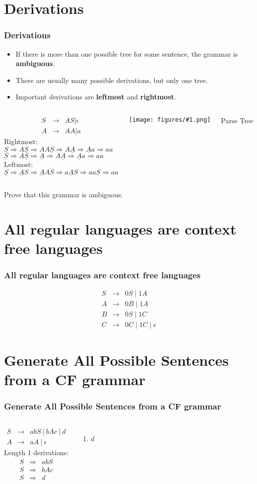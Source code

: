 \documentclass{beamer}
\newcommand{\myfig}[1]{\centerline{\texttt{[image: figures/\#1.png]}}}
\newcommand{\arr}{&\rightarrow&}
\newcommand{\darr}{&\Rightarrow&}
\newcommand{\dar}{\Rightarrow}
\newcommand{\bee}{\begin{eqnarray*}}
\newcommand{\eee}{\end{eqnarray*}}
\newcommand{\emptystring}{\ensuremath{\epsilon}}
\newcommand{\bi}{\begin{itemize}}
\newcommand{\li}{\item}
\newcommand{\ei}{\end{itemize}}
\newcommand{\sect}[1]{
\section{#1}
\begin{frame}[fragile]\frametitle{#1}
}
\begin{document}
\newcommand{\ul}[1]{\underline{#1}}
\sect{Derivations}
\bi
\li If there is more than one possible tree for some sentence, 
the grammar is {\bf ambiguous}.
\li There are usually many possible derivations, but only one tree.
\li Important derivations are {\bf leftmost} and {\bf rightmost}.
\ei
\begin{columns}
\bee
S \arr AS | \emptystring \\
A \arr AA | a
\eee
Rightmost:\\
\(
\ul{S} \dar A\ul{S} \dar AA\ul{S} \dar A\ul{A} \dar \ul{A}a \dar aa
\)\\
\(
\ul{S} \dar A\ul{S} \dar \ul{A} \dar A\ul{A} \dar \ul{A}a \dar aa
\)\\
Leftmost:\\
\(
\ul{S} \dar \ul{A}S \dar \ul{A}AS \dar a\ul{A}S \dar aa\ul{S} \dar aa
\)

\myfig{derivationtree}

\centerline{Parse Tree}

\end{columns}
\bigskip
\centerline{Prove that this grammar is ambiguous.}
\end{frame}

\sect{All regular languages are context free languages}
\bee
S \arr 0S \mid 1A \\
A \arr 0B \mid 1A \\
B \arr 0S \mid 1C \\
C \arr 0C \mid 1C \mid \emptystring
\eee

\end{frame}

\sect{Generate All Possible Sentences from a CF grammar}
\begin{columns}
\bee
S \arr abS \ | \ bAc \ | \ d\\
A \arr aA \ | \ \emptystring
\eee
{}
Length 1 derivations:
\bee
S \darr abS\\
S \darr bAc\\
S \darr d\\
\eee
{}
\begin{enumerate}
\item $d$
\end{enumerate}
\end{columns}
\end{frame}
\end{document}
